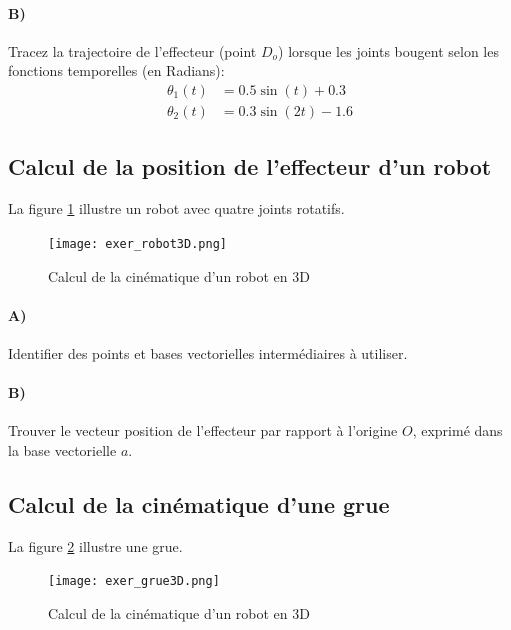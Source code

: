 \paragraph{B)} 
Tracez la trajectoire de l'effecteur (point $D_o$) lorsque les joints bougent selon les fonctions temporelles (en Radians):
\begin{align}
\theta_1(t) &= 0.5 \sin(t) + 0.3 \\
\theta_2(t) &= 0.3 \sin(2t) - 1.6
\end{align} 




\subsection{Calcul de la position de l'effecteur d'un robot}

La figure \ref{fig:exer_robot3D} illustre un robot avec quatre joints rotatifs. 
\begin{figure}[H]
	\centering
		\texttt{[image: exer\_robot3D.png]}
	\caption{Calcul de la cinématique d'un robot en 3D}
	\label{fig:exer_robot3D}
\end{figure}

\paragraph{A)}
Identifier des points et bases vectorielles intermédiaires à utiliser. 

\paragraph{B)} 
Trouver le vecteur position de l'effecteur par rapport à l'origine $O$, exprimé dans la base vectorielle $a$.


\subsection{Calcul de la cinématique d'une grue}

La figure \ref{fig:exer_grue3D} illustre une grue. 
\begin{figure}[H]
	\centering
		\texttt{[image: exer\_grue3D.png]}
	\caption{Calcul de la cinématique d'un robot en 3D}
	\label{fig:exer_grue3D}
\end{figure}


